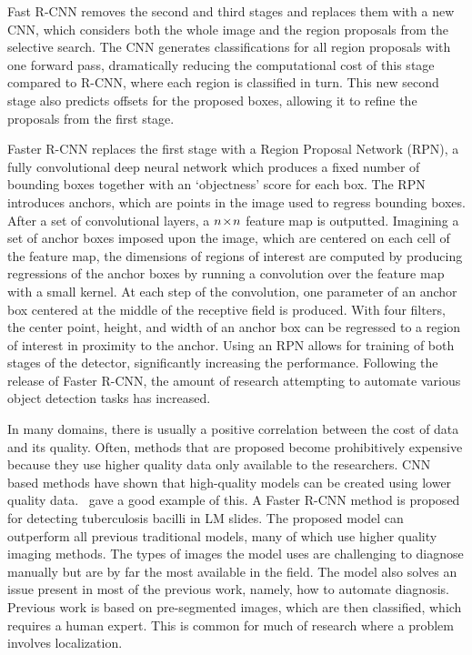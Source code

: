 Fast R-CNN removes the second and third stages and replaces them with a new CNN, which considers both the whole image and the region proposals from the selective search.
The CNN generates classifications for all region proposals with one forward pass, dramatically reducing the computational cost of this stage compared to R-CNN, where each region is classified in turn.
This new second stage also predicts offsets for the proposed boxes, allowing it to refine the proposals from the first stage.%

Faster R-CNN replaces the first stage with a Region Proposal Network (RPN), a fully convolutional deep neural network which produces a fixed number of bounding boxes together with an `objectness' score for each box.
The RPN introduces anchors, which are points in the image used to regress bounding boxes.
After a set of convolutional layers, a \(n\!\times \! n\) feature map is outputted.
Imagining a set of anchor boxes imposed upon the image, which are centered on each cell of the feature map, the dimensions of regions of interest are computed by producing regressions of the anchor boxes by running a convolution over the feature map with a small kernel.
At each step of the convolution, one parameter of an anchor box centered at the middle of the receptive field is produced.
With four filters, the center point, height, and width of an anchor box can be regressed to a region of interest in proximity to the anchor.
Using an RPN allows for training of both stages of the detector, significantly increasing the performance.
Following the release of Faster R-CNN, the amount of research attempting to automate various object detection tasks has increased.

In many domains, there is usually a positive correlation between the cost of data and its quality.
Often, methods that are proposed become prohibitively expensive because they use higher quality data only available to the researchers.
CNN based methods have shown that high-quality models can be created using lower quality data.\ \textcite{el_melegy_automatic_2019} gave a good example of this.
A Faster R-CNN method is proposed for detecting tuberculosis bacilli in LM slides.
The proposed model can outperform all previous traditional models, many of which use higher quality imaging methods.
The types of images the model uses are challenging to diagnose manually but are by far the most available in the field.
The model also solves an issue present in most of the previous work, namely, how to automate diagnosis.
Previous work is based on pre-segmented images, which are then classified, which requires a human expert.
This is common for much of research where a problem involves localization.

